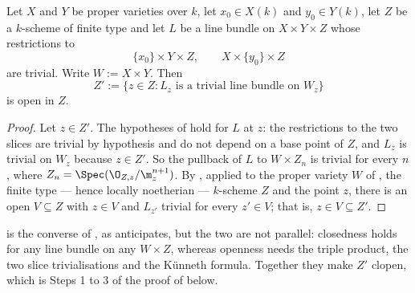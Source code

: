 \begin{lemma}
\label{lem:cube-triviality-open}
Let $X$ and $Y$ be proper varieties over $k$, let $x_0\in X(k)$ and
$y_0\in Y(k)$, let $Z$ be a $k$-scheme of finite type and let $L$ be a line
bundle on $X\times Y\times Z$ whose restrictions to
\[
  \{x_0\}\times Y\times Z,\qquad X\times\{y_0\}\times Z
\]
are trivial.  Write $W:=X\times Y$.  Then
\[
  Z':=\{z\in Z:L_z\text{ is a trivial line bundle on }W_z\}
\]
is open in $Z$.
\end{lemma}
\begin{proof}
Let $z\in Z'$.  The hypotheses of 
hold for $L$ at $z$: the restrictions to the two slices are trivial by
hypothesis and do not depend on a base point of $Z$, and $L_z$ is trivial on
$W_z$ because $z\in Z'$.  So the pullback of $L$ to $W\times Z_n$ is trivial
for every $n$, where $Z_n=\Spec(\O_{Z,z}/\m_z^{n+1})$.  By
, applied to the proper variety $W$ of
, the finite type --- hence locally noetherian
--- $k$-scheme $Z$ and the point $z$, there is an open $V\subseteq Z$ with
$z\in V$ and $L_{z'}$ trivial for every $z'\in V$; that is,
$z\in V\subseteq Z'$.
\end{proof}

\begin{remark}
\label{rem:cube-triviality-open}
 is the converse of
, as 
anticipates, but the two are not parallel: closedness holds for any line
bundle on any $W\times Z$, whereas openness needs the triple product, the two
slice trivialisations and the K\"unneth formula.  Together they make $Z'$
clopen, which is Steps 1 to 3 of the proof of  below.
\end{remark}

